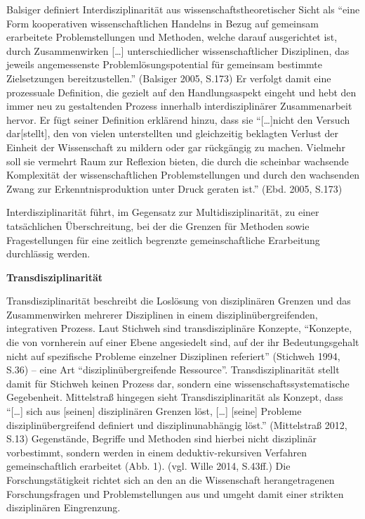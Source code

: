 \documentclass[a4paper,
fontsize=11pt,
oneside,
numbers=noperiodatend,
parskip=half-,
bibliography=totoc,
final
]{scrartcl}
\begin{document}
Balsiger definiert Interdisziplinarität aus wissenschaftstheoretischer
Sicht als \enquote{eine Form kooperativen wissenschaftlichen Handelns in
Bezug auf gemeinsam erarbeitete Problemstellungen und Methoden, welche
darauf ausgerichtet ist, durch Zusammenwirken {[}\ldots{}{]}
unterschiedlicher wissenschaftlicher Disziplinen, das jeweils
angemessenste Problemlösungspotential für gemeinsam bestimmte
Zielsetzungen bereitzustellen.} (Balsiger 2005, S.173) Er verfolgt damit
eine prozessuale Definition, die gezielt auf den Handlungsaspekt eingeht
und hebt den immer neu zu gestaltenden Prozess innerhalb
interdisziplinärer Zusammenarbeit hervor. Er fügt seiner Definition
erklärend hinzu, dass sie \enquote{{[}\ldots{}{]}nicht den Versuch
dar{[}stellt{]}, den von vielen unterstellten und gleichzeitig beklagten
Verlust der Einheit der Wissenschaft zu mildern oder gar rückgängig zu
machen. Vielmehr soll sie vermehrt Raum zur Reflexion bieten, die durch
die scheinbar wachsende Komplexität der wissenschaftlichen
Problemstellungen und durch den wachsenden Zwang zur
Erkenntnisproduktion unter Druck geraten ist.} (Ebd. 2005, S.173)

Interdisziplinarität führt, im Gegensatz zur Multidisziplinarität, zu
einer tatsächlichen Überschreitung, bei der die Grenzen für Methoden
sowie Fragestellungen für eine zeitlich begrenzte gemeinschaftliche
Erarbeitung durchlässig werden.

\textbf{Transdisziplinarität}

Transdisziplinarität beschreibt die Loslösung von disziplinären Grenzen
und das Zusammenwirken mehrerer Disziplinen in einem
disziplinübergreifenden, integrativen Prozess. Laut Stichweh sind
transdisziplinäre Konzepte, \enquote{Konzepte, die von vornherein auf
einer Ebene angesiedelt sind, auf der ihr Bedeutungsgehalt nicht auf
spezifische Probleme einzelner Disziplinen referiert} (Stichweh 1994,
S.36) -- eine Art \enquote{disziplinübergreifende Ressource}.
Transdisziplinarität stellt damit für Stichweh keinen Prozess dar,
sondern eine wissenschaftssystematische Gegebenheit. Mittelstraß
hingegen sieht Transdisziplinarität als Konzept, dass
\enquote{{[}\ldots{}{]} sich aus {[}seinen{]} disziplinären Grenzen
löst, {[}\ldots{}{]} {[}seine{]} Probleme disziplinübergreifend
definiert und disziplinunabhängig löst.} (Mittelstraß 2012, S.13)
Gegenstände, Begriffe und Methoden sind hierbei nicht disziplinär
vorbestimmt, sondern werden in einem deduktiv-rekursiven Verfahren
gemeinschaftlich erarbeitet (Abb. 1). (vgl. Wille 2014, S.43ff.) Die
Forschungstätigkeit richtet sich an den an die Wissenschaft
herangetragenen Forschungsfragen und Problemstellungen aus und umgeht
damit einer strikten disziplinären Eingrenzung.
\end{document}
